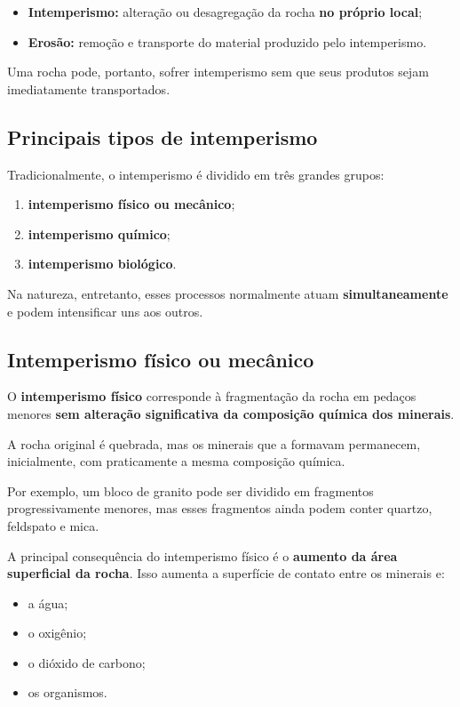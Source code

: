 \documentclass[a4paper,12pt]{article}
\theoremstyle{definition}
\theoremstyle{definition}
\theoremstyle{definition}
\begin{document}
\begin{itemize}
    \item \textbf{Intemperismo:} alteração ou desagregação da rocha \textbf{no próprio local};
    \item \textbf{Erosão:} remoção e transporte do material produzido pelo intemperismo.
\end{itemize}

Uma rocha pode, portanto, sofrer intemperismo sem que seus produtos sejam imediatamente transportados.

\subsection{Principais tipos de intemperismo}

Tradicionalmente, o intemperismo é dividido em três grandes grupos:

\begin{enumerate}
    \item \textbf{intemperismo físico ou mecânico};
    \item \textbf{intemperismo químico};
    \item \textbf{intemperismo biológico}.
\end{enumerate}

Na natureza, entretanto, esses processos normalmente atuam \textbf{simultaneamente} e podem intensificar uns aos outros.

\subsection{Intemperismo físico ou mecânico}

O \textbf{intemperismo físico} corresponde à fragmentação da rocha em pedaços menores \textbf{sem alteração significativa da composição química dos minerais}.

A rocha original é quebrada, mas os minerais que a formavam permanecem, inicialmente, com praticamente a mesma composição química.

Por exemplo, um bloco de granito pode ser dividido em fragmentos progressivamente menores, mas esses fragmentos ainda podem conter quartzo, feldspato e mica.

A principal consequência do intemperismo físico é o \textbf{aumento da área superficial da rocha}. Isso aumenta a superfície de contato entre os minerais e:

\begin{itemize}
    \item a água;
    \item o oxigênio;
    \item o dióxido de carbono;
    \item os organismos.
\end{itemize}
\end{document}
